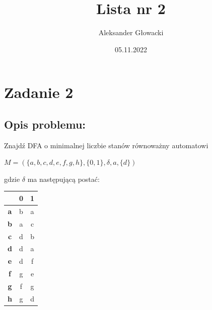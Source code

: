 \documentclass[12pt]{article}
\author{Aleksander Głowacki}
\title{Lista nr 2}
\date{05.11.2022}
\begin{document}
\maketitle

\section*{Zadanie 2}

\subsection*{Opis problemu:}
Znajdź DFA o minimalnej liczbie stanów równoważny automatowi

\begin{center} 
    $M = (\{a, b, c, d, e, f, g, h\}, \{0, 1\}, \delta, a, \{d\})$
\end{center}

gdzie $\delta$ ma następującą postać: 

\begin{table}[h]
    \label{epsilon}
    \centering
    \begin{tabular}{c||c|c}
          & \textbf{0} & \textbf{1}\\
        \hline
        \textbf{a} & b & a\\
        \hline
        \textbf{b} & a & c\\
        \hline
        \textbf{c} & d & b\\
        \hline
        \textbf{d} & d & a\\
        \hline
        \textbf{e} & d & f\\
        \hline
        \textbf{f} & g & e\\        
        \hline   
        \textbf{g} & f & g\\
        \hline
        \textbf{h} & g & d\\
    \end{tabular} 
\end{table}
\end{document}

